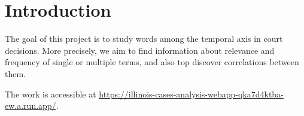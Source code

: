 \section{Introduction}

The goal of this project is to study words among the 
temporal axis in court decisions. 
More precisely, we aim to find information about relevance and 
frequency of single or multiple terms, and also top discover 
correlations between them. 

The work is accessible at \url{https://illinois-cases-analysis-webapp-qka7d4ktba-ew.a.run.app/}.